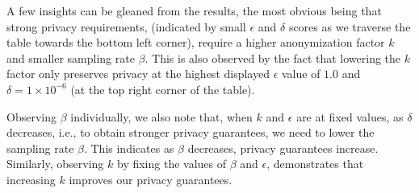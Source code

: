 \documentclass[letterpaper]{article}
\begin{document}
A few insights can be gleaned from the results, the most obvious being that strong privacy requirements, (indicated by small $\epsilon$ and $\delta$ scores as we traverse the table towards the bottom left corner), require a higher anonymization factor $k$ and smaller sampling rate $\beta$. This is also observed by the fact that lowering the $k$ factor only preserves privacy at the highest displayed $\epsilon$ value of $1.0$ and $\delta = 1 \times 10^{-6}$ (at the top right corner of the table).

Observing $\beta$ individually, we also note that, when $k$ and $\epsilon$ are at fixed values, as $\delta$ decreases, i.e., to obtain stronger privacy guarantees, we need to lower the sampling rate $\beta$. This indicates as $\beta$ decreases, privacy guarantees increase. Similarly, observing $k$ by fixing the values of $\beta$ and $\epsilon$, demonstrates that increasing $k$ improves our privacy guarantees.
\end{document}
